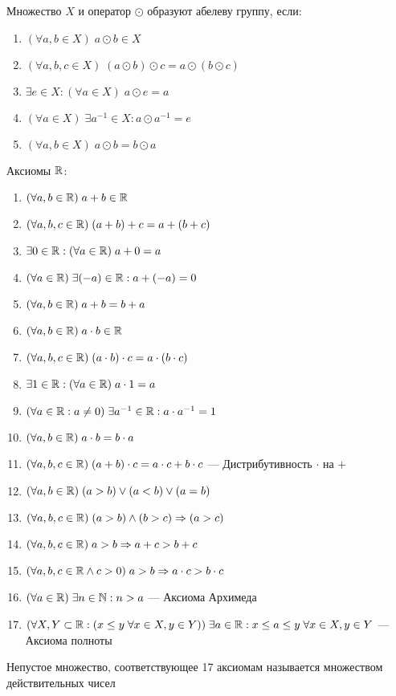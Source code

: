 \documentclass{article}
\begin{document}


Множество $X$ и оператор $\odot$ образуют абелеву группу, если:

\begin{enumerate}[label=\Roman*.]
	\item$(\forall a, b\in X)\;a\odot b\in X$
	\item$(\forall a,b,c\in X)\;(a\odot b)\odot c=a\odot(b\odot c)$
	\item$\exists e\in X:(\forall a\in X)\;a\odot e=a$
	\item$(\forall a\in X)\;\exists a^{-1}\in X:a\odot a^{-1}=e$
	\item$(\forall a, b\in X)\;a\odot b=b\odot a$
\end{enumerate}


Аксиомы $\mathbb{R}$:

\begin{enumerate}[label=\Roman*.]
	\item{}$(\forall a, b\in\mathbb{R})\;a+b\in\mathbb{R}$
	\item$(\forall a,b,c\in\mathbb{R})\;(a+b)+c=a+(b+c)$
	\item$\exists 0\in\mathbb{R}:(\forall a\in\mathbb{R})\;a+0=a$
	\item$(\forall a\in\mathbb{R})\;\exists (-a)\in\mathbb{R}:a+(-a)=0$
	\item{}$(\forall a, b\in\mathbb{R})\;a+b=b+a$
	\item{}$(\forall a, b\in \mathbb{R})\;a\cdot b\in \mathbb{R}$
	\item$(\forall a,b,c\in \mathbb{R})\;(a\cdot b)\cdot c=a\cdot(b\cdot c)$
	\item$\exists 1\in \mathbb{R}:(\forall a\in \mathbb{R})\;a\cdot 1=a$
	\item$(\forall a\in \mathbb{R}:a\neq 0)\;\exists a^{-1}\in \mathbb{R}:a\cdot a^{-1}=1$
	\item{}$(\forall a, b\in \mathbb{R})\;a\cdot b=b\cdot a$
	\item$(\forall a,b,c\in\mathbb{R})\;(a+b)\cdot c=a\cdot c+b\cdot c$ --- Дистрибутивность $\cdot$ на $+$
	\item{}$(\forall a,b\in\mathbb{R})\;(a>b)\lor (a<b)\lor (a=b)$
	\item$(\forall a,b,c\in\mathbb{R})\;(a>b)\land(b>c)\Rightarrow (a>c)$
	\item$(\forall a,b,c\in\mathbb{R})\;a>b\Rightarrow a+c>b+c$
	\item{}$(\forall a,b,c\in\mathbb{R} \land c>0)\;a>b\Rightarrow a\cdot c>b\cdot c$
	\item$(\forall a\in\mathbb{R})\;\exists n\in\mathbb{N}:n>a$ --- Аксиома Архимеда
	\item$(\forall X,Y\subset\mathbb{R}:(x\leq y\;\forall x\in X,y\in Y))\;
		\exists a\in\mathbb{R}: x\leq a\leq y\;\forall x\in X,y\in Y$ --- Аксиома полноты
\end{enumerate}
Непустое множество, соответствующее 17 аксиомам называется множеством действительных чисел
\end{document}
